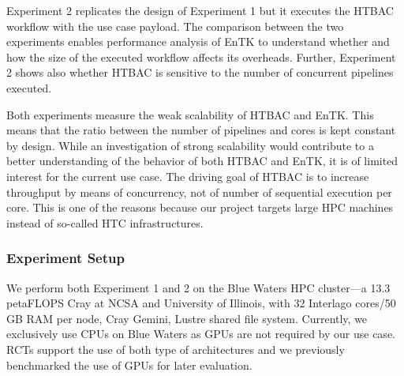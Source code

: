 Experiment 2 replicates the design of Experiment 1 but it executes the HTBAC
workflow with the use case payload. The comparison between the two
experiments enables performance analysis of EnTK to understand whether and
how the size of the executed workflow affects its overheads. Further,
Experiment 2 shows also whether HTBAC is sensitive to the number of
concurrent pipelines executed.


Both experiments measure the weak scalability of HTBAC and EnTK\@. This means
that the ratio between the number of pipelines and cores is kept constant by
design. While an investigation of strong scalability would contribute to a
better understanding of the behavior of both HTBAC and EnTK, it is of limited
interest for the current use case. The driving goal of HTBAC is to increase
throughput by means of concurrency, not of number of sequential execution per
core. This is one of the reasons because our project targets large HPC
machines instead of so-called HTC infrastructures.


\subsubsection{Experiment Setup}\label{ssec:exp_setup}

We perform both Experiment 1 and 2 %
on the Blue Waters HPC cluster---a 13.3 petaFLOPS Cray at NCSA and University
of Illinois, with 32 Interlago cores/50 GB RAM per node, Cray Gemini, Lustre
shared file system. Currently, we exclusively use CPUs on Blue Waters as GPUs
are not required by our use case. RCTs support the use of both type of
architectures and we previously benchmarked the use of GPUs for later
evaluation.


